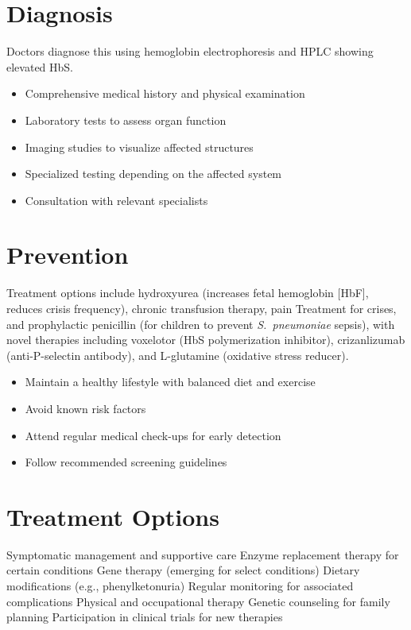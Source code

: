 \section{Diagnosis}
Doctors diagnose this using hemoglobin electrophoresis and HPLC showing elevated HbS.

\begin{itemize}[noitemsep]
  \item Comprehensive medical history and physical examination
  \item Laboratory tests to assess organ function
  \item Imaging studies to visualize affected structures
  \item Specialized testing depending on the affected system
  \item Consultation with relevant specialists
\end{itemize}
\section{Prevention}
Treatment options include hydroxyurea (increases fetal hemoglobin [HbF], reduces crisis frequency), chronic transfusion therapy, pain Treatment for crises, and prophylactic penicillin (for children to prevent \textit{S.~pneumoniae} sepsis), with novel therapies including voxelotor (HbS polymerization inhibitor), crizanlizumab (anti-P-selectin antibody), and L-glutamine (oxidative stress reducer).

\begin{itemize}[noitemsep]
  \item Maintain a healthy lifestyle with balanced diet and exercise
  \item Avoid known risk factors
  \item Attend regular medical check-ups for early detection
  \item Follow recommended screening guidelines
\end{itemize}
\section{Treatment Options}
Symptomatic management and supportive care Enzyme replacement therapy for certain conditions Gene therapy (emerging for select conditions) Dietary modifications (e.g., phenylketonuria) Regular monitoring for associated complications Physical and occupational therapy Genetic counseling for family planning Participation in clinical trials for new therapies

